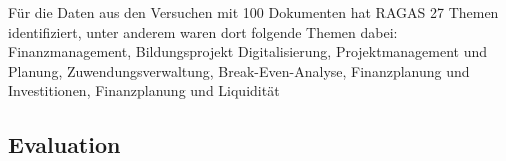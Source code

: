 Für die Daten aus den Versuchen mit 100 Dokumenten hat RAGAS 27 Themen identifiziert, unter anderem waren dort folgende Themen dabei:\\
Finanzmanagement, Bildungsprojekt Digitalisierung, Projektmanagement und Planung, Zuwendungsverwaltung, Break-Even-Analyse, Finanzplanung und Investitionen, Finanzplanung und Liquidität

\subsection{Evaluation}